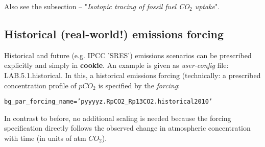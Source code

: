 \noindent Also see the subsection -- "\textit{Isotopic tracing of fossil fuel CO$_{2}$ uptake}".

\newpage

\subsection{Historical (real-world!) emissions forcing}

Historical and future (e.g. IPCC 'SRES') emissions scenarios can  be prescribed explicitly and simply in \textbf{cookie}. An example is given as \textit{user-config} file: \textsf{\footnotesize LAB.5.1.historical}. In this, a historical emissions forcing (technically: a prescribed concentration profile of \(pCO_{2}\) is specified by the \textit{forcing}:
\vspace{-2pt}\small\begin{verbatim}
bg_par_forcing_name=’pyyyyz.RpCO2_Rp13CO2.historical2010’
\end{verbatim}\normalsize\vspace{-2pt}
In contrast to before, no additional scaling is needed because the forcing specification directly follows the observed change in atmospheric concentration with time (in units of atm \(CO_{2}\)).

\vspace{1mm}

